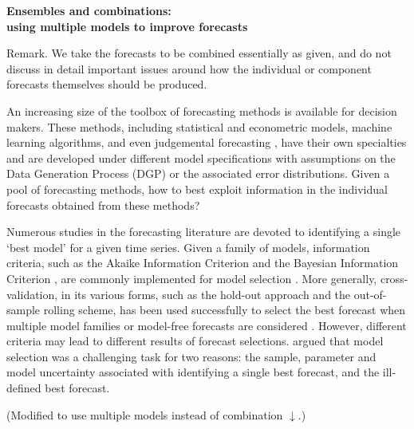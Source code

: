 \documentclass[11pt]{article}
\begin{document}
\def\spacingset#1{\renewcommand{\baselinestretch}%
{#1}\small\normalsize} \spacingset{1}

\begin{center}
{\bf\Large Ensembles and combinations: \\using multiple models to improve forecasts}
\end{center}


\bigskip


\spacingset{1.5}

Remark. We take the forecasts to be combined essentially as given, and do not discuss in detail important issues around how the individual or component forecasts themselves should be produced.

An increasing size of the toolbox of forecasting methods is available for decision makers. These methods, including statistical and econometric models, machine learning algorithms, and even judgemental forecasting \citep[see an encyclopedic overview by][]{petropoulos2020forecasting}, have their own specialties and are developed under different model specifications with assumptions on the Data Generation Process (DGP) or the associated error distributions. Given a pool of forecasting methods, how to best exploit information in the individual forecasts obtained from these methods?

Numerous studies in the forecasting literature are devoted to identifying a single `best model' for a given time series. Given a family of models, information criteria, such as the Akaike Information Criterion \citep[AIC,][]{Akaike1974-ya} and the Bayesian Information Criterion \citep[BIC,][]{Schwarz1978-cz}, are commonly implemented for model selection \citep[e.g.,][]{qi2001investigation,billah2005empirical,yang2005can}. More generally, cross-validation, in its various forms, such as the hold-out approach and the out-of-sample rolling scheme, has been used successfully to select the best forecast when multiple model families or model-free forecasts are considered \citep[e.g.,][]{Kohavi1995-zv,poler2011forecasting,fildes2015simple,inoue2017rolling,talagala2018meta}. However, different criteria may lead to different results of forecast selections. \cite{Kourentzes2019-na} argued that model selection was a challenging task for two reasons: the sample, parameter and model uncertainty associated with identifying a single best forecast, and the ill-defined best forecast.

{\color{red} (Modified to use multiple models instead of combination $\downarrow$.)}
\end{document}
